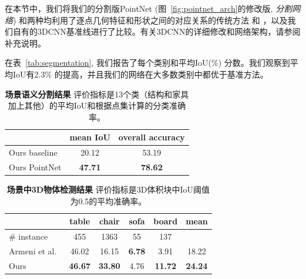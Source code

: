 在本节中，我们将我们的分割版PointNet (图~\ref{fig:pointnet_arch}的修改版, \textit{分割网络}) 和两种均利用了逐点几何特征和形状之间的对应关系的传统方法 \cite{Wu2014248} 和 \cite{Yi16} ，以及我们自有的3DCNN基准线进行了比较。有关3DCNN的详细修改和网络架构，请参阅补充说明。

在表~\ref{tab:segmentation}, 我们报告了每个类别和平均IoU(\%) 分数。我们观察到平均IoU有2.3\% 的提高，并且我们的网络在大多数类别中都优于基准方法。


\begin{table}[b!]
    \centering
    \small
    \begin{tabular}[width=\linewidth]{l|c|c}
    \hline
    ~             & mean IoU  & overall accuracy \\ \hline
    Ours baseline          &  20.12 & 53.19    \\ \hline
    Ours PointNet          & \textbf{47.71} & \textbf{78.62}  \\ \hline
    \end{tabular}
    \caption{\textbf{场景语义分割结果} 评价指标是13个类（结构和家具加上其他）的平均IoU和根据点集计算的分类准确率。 }
    \label{tab:semantic_segmentation}
\end{table}

\begin{table}[b!]
    \centering
    \small
    \begin{tabular}[width=\linewidth]{l|cccc|c}
    \hline
    ~                              & table & chair & sofa & board & mean  \\ \hline
    \# instance & 455 & 1363 & 55 & 137 & ~ \\ \hline
    Armeni et al.~\cite{armeni_cvpr16}          & 46.02 & 16.15 & \textbf{6.78} & 3.91  & 18.22 \\ \hline
    Ours & \textbf{46.67}     & \textbf{33.80 }    & 4.76    & \textbf{11.72}     & \textbf{24.24}     \\ \hline
    \end{tabular}
    \caption{\textbf{场景中3D物体检测结果} 评价指标是3D体积块中IoU阈值为0.5的平均准确率。}
    \label{tab:3d_detection}
\end{table}



